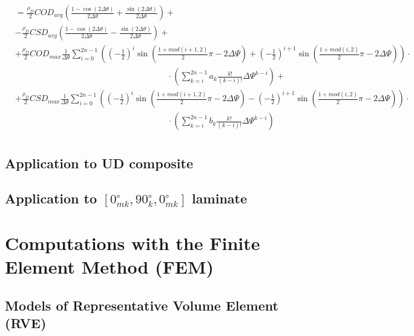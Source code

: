 \documentclass[review]{elsarticle}
\begin{document}
\begin{enumerate}
\begin{equation}
\begin{aligned}
&=\frac{\rho_{D}}{2}COD_{avg}\left(\frac{1-\cos\left(2\Delta\theta\right)}{2\Delta\theta}+\frac{\sin\left(2\Delta\theta\right)}{2\Delta\theta}\right)+\\
&-\frac{\rho_{D}}{2}CSD_{avg}\left(\frac{1-\cos\left(2\Delta\theta\right)}{2\Delta\theta}-\frac{\sin\left(2\Delta\theta\right)}{2\Delta\theta}\right)+\\
&+\frac{\rho_{D}}{2}COD_{max}\frac{1}{\Delta\theta}\sum_{i=0}^{2n-1}\left(\left(-\frac{1}{2}\right)^{i}\sin\left(\frac{1+mod\left(i+1,2\right)}{2}\pi-2\Delta\Psi\right)+\left(-\frac{1}{2}\right)^{i+1}\sin\left(\frac{1+mod\left(i,2\right)}{2}\pi-2\Delta\Psi\right)\right)\cdot\\&\qquad\qquad\qquad\qquad\qquad\qquad\qquad\qquad\qquad\cdot\left(\sum_{k=i}^{2n-1}a_{k}\frac{k!}{\left(k-i\right)!}\Delta\Psi^{k-i}\right)+\\
&+\frac{\rho_{D}}{2}CSD_{max}\frac{1}{\Delta\theta}\sum_{i=0}^{2n-1}\left(\left(-\frac{1}{2}\right)^{i}\sin\left(\frac{1+mod\left(i+1,2\right)}{2}\pi-2\Delta\Psi\right)-\left(-\frac{1}{2}\right)^{i+1}\sin\left(\frac{1+mod\left(i,2\right)}{2}\pi-2\Delta\Psi\right)\right)\cdot\\&\qquad\qquad\qquad\qquad\qquad\qquad\qquad\qquad\qquad\cdot\left(\sum_{k=i}^{2n-1}b_{k}\frac{k!}{\left(k-i\right)!}\Delta\Psi^{k-i}\right)\\
\end{aligned}
\end{equation}

\end{enumerate}

\subsection{Application to UD composite}

\subsection{Application to $\left[0^{\circ}_{mk},90^{\circ}_{k},0^{\circ}_{mk}\right]$ laminate}

\section{Computations with the Finite Element Method (FEM)}

\subsection{Models of Representative Volume Element (RVE)}
\end{document}
